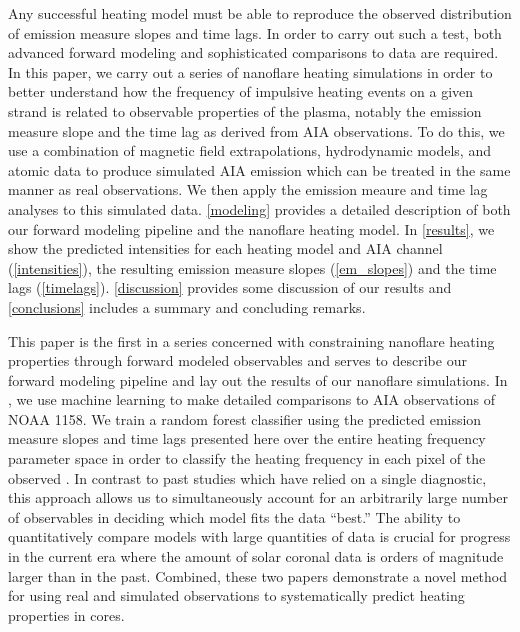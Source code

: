 Any successful heating model must be able to reproduce the observed distribution of emission measure slopes and time lags. In order to carry out such a test, both advanced forward modeling and sophisticated comparisons to data are required. In this paper, we carry out a series of nanoflare heating simulations in order to better understand how the frequency of impulsive heating events on a given strand is related to observable properties of the plasma, notably the emission measure slope and the time lag as derived from AIA observations. To do this, we use a combination of magnetic field extrapolations, hydrodynamic models, and atomic data to produce simulated AIA emission which can be treated in the same manner as real observations. We then apply the emission meaure and time lag analyses to this simulated data. \autoref{modeling} provides a detailed description of both our forward modeling pipeline and the nanoflare heating model. In \autoref{results}, we show the predicted intensities for each heating model and AIA channel (\autoref{intensities}), the resulting emission measure slopes (\autoref{em_slopes}) and the time lags (\autoref{timelags}). \autoref{discussion} provides some discussion of our results and \autoref{conclusions} includes a summary and concluding remarks.

This paper is the first in a series concerned with constraining nanoflare heating properties through forward modeled observables and serves to describe our forward modeling pipeline and lay out the results of our nanoflare simulations. In \citet[ hereafter]{barnes_understanding_2019-1}, we use machine learning to make detailed comparisons to AIA observations of \AR{} NOAA 1158. We train a random forest classifier using the predicted emission measure slopes and time lags presented here over the entire heating frequency parameter space in order to classify the heating frequency in each pixel of the observed \AR{}. In contrast to past studies which have relied on a single diagnostic, this approach allows us to simultaneously account for an arbitrarily large number of observables in deciding which model fits the data ``best.'' The ability to quantitatively compare models with large quantities of data is crucial for progress in the current era where the amount of solar coronal data is orders of magnitude larger than in the past.  Combined, these two papers demonstrate a novel method for using real and simulated observations to systematically predict heating properties in \AR{} cores.
